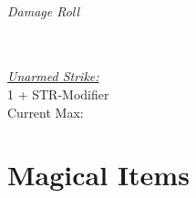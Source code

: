 \documentclass[letterpaper,openany,oneside,twocolumn]{book}
\newcommand{\PATH}{../../}
\begin{document}
\paragraph*{Damage Roll}\hfill\\
\underline{\textit{Unarmed Strike:}}\\
1 + STR-Modifier\\
\indent Current Max: 

\part*{Magical Items}


\end{document}
